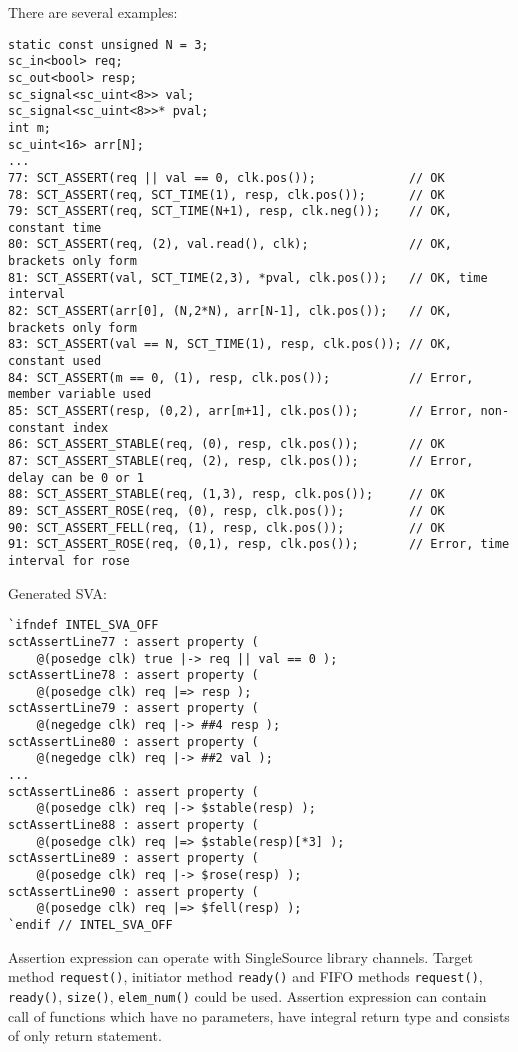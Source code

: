 There are several examples:
\begin{lstlisting}[style=mycpp]
static const unsigned N = 3;
sc_in<bool> req;
sc_out<bool> resp;
sc_signal<sc_uint<8>> val;
sc_signal<sc_uint<8>>* pval;
int m;
sc_uint<16> arr[N];
...
77: SCT_ASSERT(req || val == 0, clk.pos());             // OK
78: SCT_ASSERT(req, SCT_TIME(1), resp, clk.pos());      // OK
79: SCT_ASSERT(req, SCT_TIME(N+1), resp, clk.neg());    // OK, constant time
80: SCT_ASSERT(req, (2), val.read(), clk);              // OK, brackets only form
81: SCT_ASSERT(val, SCT_TIME(2,3), *pval, clk.pos());   // OK, time interval
82: SCT_ASSERT(arr[0], (N,2*N), arr[N-1], clk.pos());   // OK, brackets only form
83: SCT_ASSERT(val == N, SCT_TIME(1), resp, clk.pos()); // OK, constant used
84: SCT_ASSERT(m == 0, (1), resp, clk.pos());           // Error, member variable used
85: SCT_ASSERT(resp, (0,2), arr[m+1], clk.pos());       // Error, non-constant index
86: SCT_ASSERT_STABLE(req, (0), resp, clk.pos());       // OK
87: SCT_ASSERT_STABLE(req, (2), resp, clk.pos());       // Error, delay can be 0 or 1
88: SCT_ASSERT_STABLE(req, (1,3), resp, clk.pos());     // OK
89: SCT_ASSERT_ROSE(req, (0), resp, clk.pos());         // OK  
90: SCT_ASSERT_FELL(req, (1), resp, clk.pos());         // OK  
91: SCT_ASSERT_ROSE(req, (0,1), resp, clk.pos());       // Error, time interval for rose
\end{lstlisting}
%
Generated SVA:
\begin{lstlisting}[style=myverilog]
`ifndef INTEL_SVA_OFF
sctAssertLine77 : assert property (
    @(posedge clk) true |-> req || val == 0 );
sctAssertLine78 : assert property (
    @(posedge clk) req |=> resp );
sctAssertLine79 : assert property (
    @(negedge clk) req |-> ##4 resp );
sctAssertLine80 : assert property (
    @(negedge clk) req |-> ##2 val );
...
sctAssertLine86 : assert property (
    @(posedge clk) req |-> $stable(resp) );
sctAssertLine88 : assert property (
    @(posedge clk) req |=> $stable(resp)[*3] );
sctAssertLine89 : assert property (
    @(posedge clk) req |-> $rose(resp) );
sctAssertLine90 : assert property (
    @(posedge clk) req |=> $fell(resp) );
`endif // INTEL_SVA_OFF
\end{lstlisting}

Assertion expression can operate with SingleSource library channels. Target method {\tt request()}, initiator method {\tt ready()} and FIFO methods {\tt request()}, {\tt ready()}, {\tt size()}, {\tt elem\_num()} could be used. 
Assertion expression can contain call of functions which have no parameters, have integral return type and consists of only return statement.


